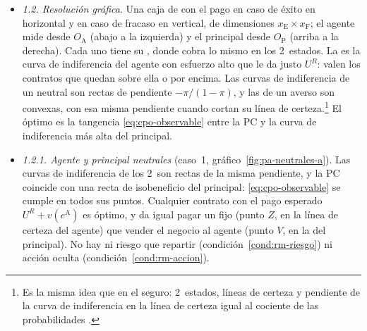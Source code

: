 \documentclass[11pt]{article}
\begin{document}
\begin{itemize}
\begin{equation}
  \end{equation}
  \begin{itemize}
  \item Con $\lambda_1$, el multiplicador de la PC, las condiciones de primer orden son (anexo~\ref{anexo:pa-borch})
  \begin{equation}
  \frac{1}{u'(w_{\mathrm{E}})}=\frac{1}{u'(w_{\mathrm{F}})}=\lambda_1\quad\Longleftrightarrow\quad \underbrace{\frac{\pi(e^{\mathrm{A}})\,u'(w_{\mathrm{E}})}{\bigl[1-\pi(e^{\mathrm{A}})\bigr]u'(w_{\mathrm{F}})}}_{\mathrm{RMSE}\text{ del agente}}=\underbrace{\frac{\pi(e^{\mathrm{A}})}{1-\pi(e^{\mathrm{A}})}}_{\mathrm{RMSE}\text{ del principal}} . \label{eq:cpo-observable}
  \end{equation}
  Es la  (RMSE) del agente y del principal: la condición de eficiencia en el reparto del riesgo. Como $\lambda_1>0$, la PC se satura: el agente queda en su utilidad de reserva.
  \end{itemize}
\item \emph{1.2. Resolución gráfica}. Una caja de  con el pago en caso de éxito en horizontal y en caso de fracaso en vertical, de dimensiones $x_{\mathrm{E}}\times x_{\mathrm{F}}$; el agente mide desde $O_{\mathrm{A}}$ (abajo a la izquierda) y el principal desde $O_{\mathrm{P}}$ (arriba a la derecha). Cada uno tiene su , donde cobra lo mismo en los 2~estados. La  es la curva de indiferencia del agente con esfuerzo alto que le da justo $U^R$: valen los contratos que quedan sobre ella o por encima. Las curvas de indiferencia de un neutral son rectas de pendiente $-\pi/(1-\pi)$, y las de un averso son convexas, con esa misma pendiente cuando cortan su línea de certeza.\footnote{Es la misma idea que en el seguro: 2~estados, líneas de certeza y pendiente de la curva de indiferencia en la línea de certeza igual al cociente de las probabilidades .} El óptimo es la tangencia \eqref{eq:cpo-observable} entre la PC y la curva de indiferencia más alta del principal.
\item \emph{1.2.1. Agente y principal neutrales} (caso~1, gráfico~\ref{fig:pa-neutrales-a}). Las curvas de indiferencia de los 2~son rectas de la misma pendiente, y la PC coincide con una recta de isobeneficio del principal: \eqref{eq:cpo-observable} se cumple en todos sus puntos. Cualquier contrato con el pago esperado $U^R+v(e^{\mathrm{A}})$ es óptimo, y da igual pagar un fijo (punto $Z$, en la línea de certeza del agente) que vender el negocio al agente (punto $V$, en la del principal). No hay ni riesgo que repartir (condición~\ref{cond:rm-riesgo}) ni acción oculta (condición~\ref{cond:rm-accion}).
\end{itemize}
\end{document}
